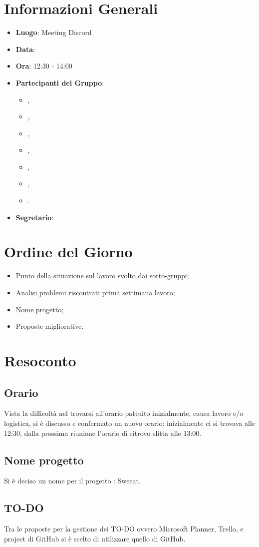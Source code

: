 \section{Informazioni Generali}

\begin{itemize}
\item{\textbf{Luogo}}: Meeting Discord
\item{\textbf{Data}}: \D{}
\item{\textbf{Ora}}: 12:30 - 14:00
\item{\textbf{Partecipanti del Gruppo}}: 
	\begin{itemize}
	\item{\EP{},} 
	\item{\FP{},}
	\item{\GC{},}
	\item{\LW{},}
	\item{\MB{},}
	\item{\MG{},}
	\item{\PV{}.}
	\end{itemize} 
\item{\textbf{Segretario}}: \PV{}	
\end{itemize}

\section{Ordine del Giorno}
\begin{itemize}
\item{Punto della situazione sul lavoro svolto dai sotto-gruppi;}
\item{Analisi problemi riscontrati prima settimana lavoro;}
\item{Nome progetto;}
\item{Proposte migliorative.}
\end{itemize}

\section{Resoconto}

\subsection{Orario}
Vista la difficoltà nel trovarsi all'orario pattuito inizialmente, causa lavoro e/o logistica, si è discusso e confermato un nuovo orario: inizialmente ci si trovava alle 12:30, dalla prossima riunione l'orario di ritrovo slitta alle 13:00.

\subsection{Nome progetto}
Si è deciso un nome per il progetto : Sweeat.


\subsection{TO-DO}
Tra le proposte per la gestione dei TO-DO ovvero Microsoft Planner, Trello, e project di GitHub si è scelto di utilizzare quello di GitHub.